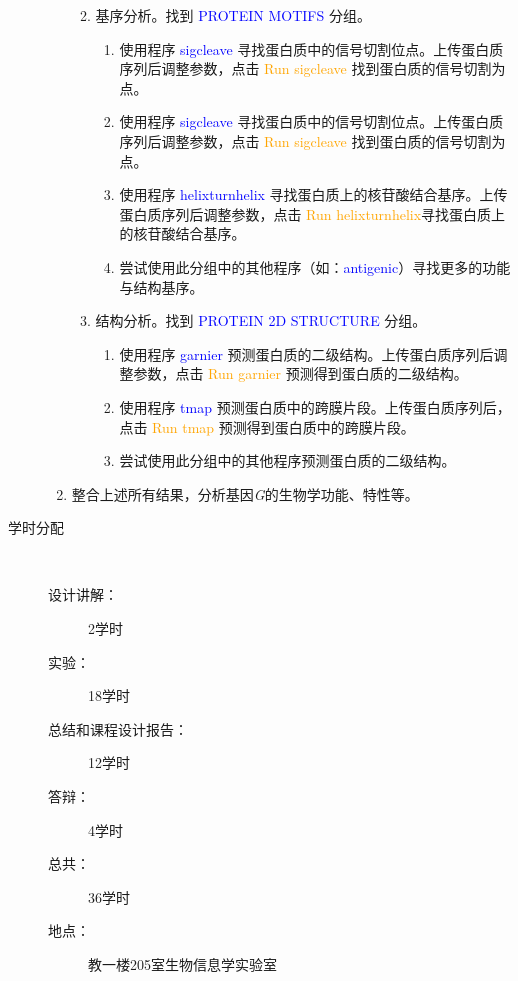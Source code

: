 \begin{description}
\begin{enumerate}
\begin{enumerate}
\begin{enumerate}
						\end{enumerate}
					\item 基序分析。找到 \textcolor{blue}{PROTEIN MOTIFS} 分组。
						\begin{enumerate}
							\item 使用程序 \textcolor{blue}{sigcleave} 寻找蛋白质中的信号切割位点。上传蛋白质序列后调整参数，点击 \textcolor{orange}{Run sigcleave} 找到蛋白质的信号切割为点。
							\item 使用程序 \textcolor{blue}{sigcleave} 寻找蛋白质中的信号切割位点。上传蛋白质序列后调整参数，点击 \textcolor{orange}{Run sigcleave} 找到蛋白质的信号切割为点。
							\item 使用程序 \textcolor{blue}{helixturnhelix} 寻找蛋白质上的核苷酸结合基序。上传蛋白质序列后调整参数，点击 \textcolor{orange}{Run helixturnhelix}寻找蛋白质上的核苷酸结合基序。
							\item 尝试使用此分组中的其他程序（如：\textcolor{blue}{antigenic}）寻找更多的功能与结构基序。
						\end{enumerate}
					\item 结构分析。找到 \textcolor{blue}{PROTEIN 2D STRUCTURE} 分组。
						\begin{enumerate}
							\item 使用程序 \textcolor{blue}{garnier} 预测蛋白质的二级结构。上传蛋白质序列后调整参数，点击 \textcolor{orange}{Run garnier} 预测得到蛋白质的二级结构。
							\item 使用程序 \textcolor{blue}{tmap} 预测蛋白质中的跨膜片段。上传蛋白质序列后，点击 \textcolor{orange}{Run tmap} 预测得到蛋白质中的跨膜片段。
							\item 尝试使用此分组中的其他程序预测蛋白质的二级结构。
						\end{enumerate}
				\end{enumerate}
			\item 整合上述所有结果，分析基因\textit{G}的生物学功能、特性等。
		\end{enumerate}
	\item[学时分配] \ 
		\begin{description}
			\item[设计讲解：] 2学时
			\item[实验：] 18学时
			\item[总结和课程设计报告：] 12学时 
			\item[答辩：] 4学时
			\item[总共：] 36学时 
			\item[地点：] 教一楼205室生物信息学实验室 
		\end{description}

\end{description}
